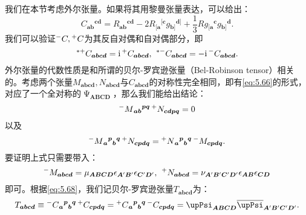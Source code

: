 我们在本节考虑外尔张量。如果将其用黎曼张量表达，可以给出：
\begin{equation*}
	C{_{\boldsymbol{ab}}}^{\boldsymbol{cd}} =R{_{\boldsymbol{ab}}}^{\boldsymbol{cd}} -2R{_{[\boldsymbol{a}}}^{[\boldsymbol{c}} g{_{\boldsymbol{b}]}}^{\boldsymbol{d}]} +\frac{1}{3} Rg{_{[\boldsymbol{a}}}^{\boldsymbol{c}} g{_{\boldsymbol{b}]}}^{\boldsymbol{d}} .
\end{equation*}
我们可以验证$\prescript{-}{}{} C,\prescript{+}{}{} C$为其反自对偶和自对偶部分，即
\begin{equation*}
	\prescript{*+}{}{} C_{\boldsymbol{abcd}} =\mathrm{i}\prescript{+}{}{} C_{\boldsymbol{abcd}} ,\kern+0.4em \prescript{*-}{}{} C_{\boldsymbol{abcd}} =-\mathrm{i}\prescript{-}{}{} C_{\boldsymbol{abcd}} .
\end{equation*}
外尔张量的代数性质是和所谓的贝尔-罗宾逊张量（Bel-Robinson tensor）相关的。考虑两个张量$M_{\boldsymbol{abcd}} ,N_{\boldsymbol{abcd}}$与$C_{\boldsymbol{abcd}}$的对称性完全相同，即有\ref{eq:5.66}的形式，对应了一个全对称的$\upPsi _{\boldsymbol{ABCD}}$，那么我们能给出结论：
\begin{equation*}
	\prescript{-}{}{} M{_{\boldsymbol{ab}}}^{\boldsymbol{pq}}\prescript{+}{}{} N_{\boldsymbol{cdpq}} =0
\end{equation*}
以及
\begin{equation}
	\prescript{-}{}{} M{_{\boldsymbol{a}}}^{\boldsymbol{p}}{}{_{\boldsymbol{b}}}^{\boldsymbol{q}}\prescript{+}{}{} N_{\boldsymbol{cpdq}} =\prescript{+}{}{} N{_{\boldsymbol{a}}}^{\boldsymbol{p}}{}{_{\boldsymbol{b}}}^{\boldsymbol{q}}\prescript{-}{}{} M_{\boldsymbol{cpdq}} .
	\label{eq:5.68}
\end{equation}
要证明上式只需要带入：
\begin{equation*}
	\prescript{-}{}{} M_{\boldsymbol{abcd}} =\mu _{\boldsymbol{ABCD}} \epsilon _{\boldsymbol{A} '\boldsymbol{B} '} \epsilon _{\boldsymbol{C} '\boldsymbol{D} '} ,\kern+0.4em \prescript{+}{}{} N_{\boldsymbol{abcd}} =\nu _{\boldsymbol{A} '\boldsymbol{B} '\boldsymbol{C} '\boldsymbol{D} '} \epsilon _{\boldsymbol{AB}} \epsilon _{\boldsymbol{CD}}
\end{equation*}
即可。根据\ref{eq:5.68}，我们记贝尔-罗宾逊张量$T_{\boldsymbol{abcd}}$为：
\begin{equation}
	T_{\boldsymbol{abcd}} \equiv \prescript{-}{}{} C{_{\boldsymbol{a}}}^{\boldsymbol{p}}{}{_{\boldsymbol{b}}}^{\boldsymbol{q}}\prescript{+}{}{} C_{\boldsymbol{cpdq}} =\prescript{+}{}{} C{_{\boldsymbol{a}}}^{\boldsymbol{p}}{}{_{\boldsymbol{b}}}^{\boldsymbol{q}}\prescript{-}{}{} C_{\boldsymbol{cpdq}} =\upPsi _{\boldsymbol{ABCD}}\overline{\upPsi }_{\boldsymbol{A} '\boldsymbol{B} '\boldsymbol{C} '\boldsymbol{D} '} .
	\label{eq:5.69}
\end{equation}
